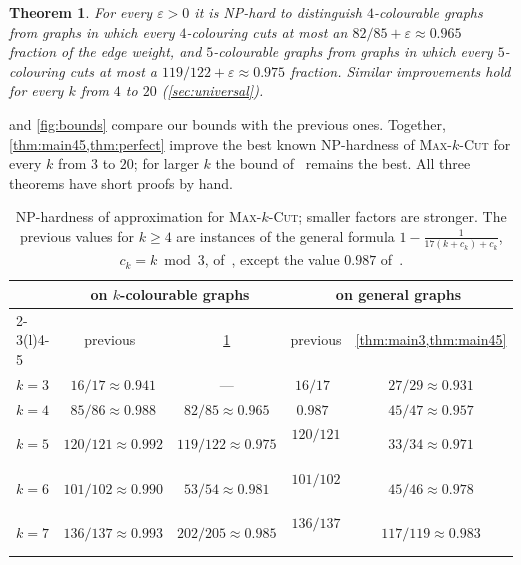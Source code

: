 \documentclass[11pt,letterpaper]{article}
\newtheorem{theorem}{Theorem}[section]
\theoremstyle{remark}
\newcommand{\MC}[1]{\textup{\textsc{Max-$#1$-Cut}}}
\newcommand{\eps}{\varepsilon}
\begin{document}
\begin{theorem}\label{thm:perfect}
For every $\eps>0$ it is NP-hard to distinguish $4$-colourable graphs from graphs in which every
$4$-colouring cuts at most an $82/85+\eps\approx0.965$ fraction of the edge weight, and $5$-colourable
graphs from graphs in which every $5$-colouring cuts at most a $119/122+\eps\approx0.975$ fraction.
Similar improvements hold for every $k$ from $4$ to $20$ (\cref{sec:universal}).
\end{theorem}

 and \cref{fig:bounds} compare our bounds with the previous ones. Together, \cref{thm:main45,thm:perfect}
improve the best known NP-hardness of \MC{k} for every $k$ from $3$ to $20$; for larger $k$ the bound
of~\cite{AOTW14} remains the best. All three theorems have short proofs by hand.

\begin{table}[t]
\centering\small\setlength{\tabcolsep}{5pt}
\begin{tabular}{@{}lcccc@{}}
\toprule
& \multicolumn{2}{c}{on $k$-colourable graphs} & \multicolumn{2}{c}{on general graphs} \\
\cmidrule(lr){2-3}\cmidrule(l){4-5}
& previous~\cite{AOTW14} & \cref{thm:perfect} & previous & \cref{thm:main3,thm:main45} \\
\midrule
$k=3$ & $16/17\approx 0.941$ & --- & $16/17$~\cite{AOTW14} & $27/29 \approx 0.931$ \\
$k=4$ & $85/86\approx 0.988$ & $82/85\approx 0.965$ & $0.987$~\cite{NRT25} & $45/47\approx 0.957$ \\
$k=5$ & $120/121\approx 0.992$ & $119/122\approx 0.975$ & $120/121$~\cite{AOTW14} & $33/34\approx 0.971$ \\
$k=6$ & $101/102\approx 0.990$ & $53/54\approx 0.981$ & $101/102$~\cite{AOTW14} & $45/46 \approx 0.978$ \\
$k=7$ & $136/137\approx 0.993$ & $202/205\approx 0.985$ & $136/137$~\cite{AOTW14} & $117/119\approx 0.983$ \\
\bottomrule
\end{tabular}
\caption{NP-hardness of approximation for \MC{k}; smaller factors are stronger. The previous values for
$k\ge4$ are instances of the general formula $1-\frac1{17(k+c_k)+c_k}$, $c_k=k\bmod3$,
of~\cite[Thm.~1.2]{AOTW14}, except the value $0.987$ of~\cite{NRT25}.}
\label{tab:summary}
\end{table}
\end{document}
